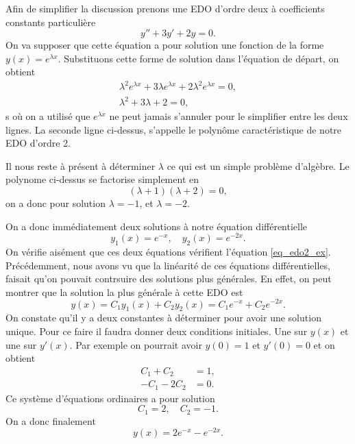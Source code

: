 \documentclass[a4paper,12pt]{book}
\renewcommand{\eqref}[1]{\ref{#1}}
\begin{document}
Afin de simplifier la discussion prenons une EDO d'ordre deux à coefficients constants particulière
\begin{equation}
 y''+3y'+2y=0.\label{eq_edo2_ex}
\end{equation}
On va supposer que cette équation a pour solution 
une fonction de la forme $y(x)=e^{\lambda x}$. Substituons cette 
forme de solution dans l'équation de départ, on obtient
\begin{align}
 \lambda^2 e^{\lambda x}+3\lambda e^{\lambda x}+2\lambda^2 e^{\lambda x}=0,\nonumber\\
 \lambda^2+3\lambda +2=0,
\end{align}s
où on a utilisé que $e^{\lambda x}$ ne peut jamais s'annuler pour le simplifier entre les deux lignes. La seconde ligne ci-dessus, s'appelle le polynôme caractéristique de notre EDO d'ordre 2. 

Il nous reste à présent à déterminer $\lambda$ ce qui est un simple problème d'algèbre. 
Le polynome ci-dessus se factorise simplement en
\begin{equation}
 (\lambda+1)(\lambda+2)=0,
\end{equation}
on a donc pour solution $\lambda=-1$, et $\lambda=-2$.

On a donc immédiatement deux solutions à notre équation différentielle
\begin{equation}
 y_1(x)=e^{-x},\quad y_2(x)=e^{-2x}.
\end{equation}
On vérifie aisément que ces deux équations vérifient l'équation \eqref{eq_edo2_ex}.
Précédemment, nous avons vu que la linéarité de ces équations différentielles, faisait
qu'on pouvait contrsuire des solutions plus générales. En effet, on peut montrer que 
la solution la plus générale à cette EDO est
\begin{equation}
 y(x)=C_1 y_1(x)+C_2y_2(x)=C_1e^{-x}+C_2e^{-2x}.
\end{equation}
On constate qu'il y a deux constantes à déterminer pour avoir une solution unique.
Pour ce faire il faudra donner deux conditions initiales. Une sur $y(x)$ et une sur $y'(x)$.
Par exemple on pourrait avoir $y(0)=1$ et $y'(0)=0$ et on obtient
\begin{align}
 C_1+C_2&=1,\\
 -C_1-2C_2&=0.
\end{align}
Ce système d'équations ordinaires a pour solution
\begin{equation}
C_1=2,\quad C_2=-1.
\end{equation}
On a donc finalement
\begin{equation}
 y(x)=2e^{-x}-e^{-2x}.
\end{equation}
\end{document}
